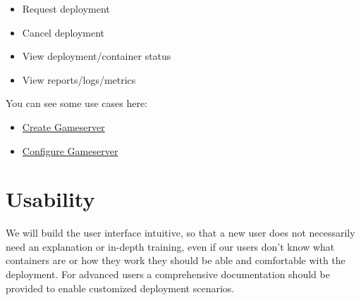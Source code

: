 \documentclass[a4paper,12pt,chapterprefix=false,bibliography=totoc,listof=totoc,]{scrreprt}
\begin{document}
\begin{itemize}
    \item Request deployment
    \item Cancel deployment
    \item View deployment/container status
    \item View reports/logs/metrics
\end{itemize}

You can see some use cases here:
\begin{itemize}
	\item \href{https://gamebase.pages.gitlab.tandashi.de/documentation/UCCreateGameServer.pdf}{Create Gameserver}
	\item \href{https://gamebase.pages.gitlab.tandashi.de/documentation/UCConfigureGameServer.pdf}{Configure Gameserver}
\end{itemize}

\section{Usability}
We will build the user interface intuitive, so that a new user does not necessarily need an explanation or in-depth training, even if our users don't know what containers are or how they work they should be able and comfortable with the deployment. For advanced users a comprehensive documentation should be provided to enable customized deployment scenarios.
\end{document}
